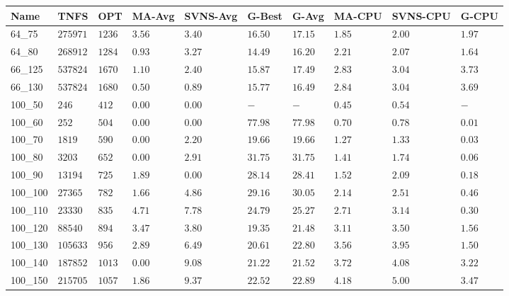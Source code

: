 \begin{center}
    \begin{table}[]
    \centering
    \begin{adjustwidth}{-0.4in}{-1in}
    \begin{tabular}{|lll|l|l|ll|lll|}
\hline
Name     & TNFS        & OPT    & MA-Avg & SVNS-Avg & G-Best & G-Avg & MA-CPU & SVNS-CPU & G-CPU \\
\hline
64\_75   & $275971   $ & $1236$ & $3.56$ & $3.40 $  & $16.50$    & $17.15$   & $1.85$ & $2.00$   & $1.97$ \\
64\_80   & $268912   $ & $1284$ & $0.93$ & $3.27 $  & $14.49$    & $16.20$   & $2.21$ & $2.07$   & $1.64$ \\
\hline
66\_125  & $537824   $ & $1670$ & $1.10$ & $2.40 $  & $15.87$    & $17.49$   & $2.83$ & $3.04$   & $3.73$ \\
66\_130  & $537824   $ & $1680$ & $0.50$ & $0.89 $  & $15.77$    & $16.49$   & $2.84$ & $3.04$   & $3.69$ \\
\hline
100\_50  & $246      $ & $412 $ & $\bm{0.00}$ & $\bm{0.00} $  & $-    $    & $-    $   & $0.45$ & $0.54$   & $-   $ \\
100\_60  & $252      $ & $504 $ & $\bm{0.00}$ & $\bm{0.00} $  & $77.98$    & $77.98$   & $0.70$ & $0.78$   & $0.01$ \\
100\_70  & $1819     $ & $590 $ & $\bm{0.00}$ & $2.20 $  & $19.66$    & $19.66$   & $1.27$ & $1.33$   & $0.03$ \\
100\_80  & $3203     $ & $652 $ & $\bm{0.00}$ & $2.91 $  & $31.75$    & $31.75$   & $1.41$ & $1.74$   & $0.06$ \\
100\_90  & $13194    $ & $725 $ & $1.89$ & $\bm{0.00} $  & $28.14$    & $28.41$   & $1.52$ & $2.09$   & $0.18$ \\
100\_100 & $27365    $ & $782 $ & $1.66$ & $4.86 $  & $29.16$    & $30.05$   & $2.14$ & $2.51$   & $0.46$ \\
100\_110 & $23330    $ & $835 $ & $4.71$ & $7.78 $  & $24.79$    & $25.27$   & $2.71$ & $3.14$   & $0.30$ \\
100\_120 & $88540    $ & $894 $ & $3.47$ & $3.80 $  & $19.35$    & $21.48$   & $3.11$ & $3.50$   & $1.56$ \\
100\_130 & $105633   $ & $956 $ & $2.89$ & $6.49 $  & $20.61$    & $22.80$   & $3.56$ & $3.95$   & $1.50$ \\
100\_140 & $187852   $ & $1013$ & $\bm{0.00}$ & $9.08 $  & $21.22$    & $21.52$   & $3.72$ & $4.08$   & $3.22$ \\
100\_150 & $215705   $ & $1057$ & $1.86$ & $9.37 $  & $22.52$    & $22.89$   & $4.18$ & $5.00$   & $3.47$ \\

\end{tabular}
\end{adjustwidth}
\end{table}
\end{center}
